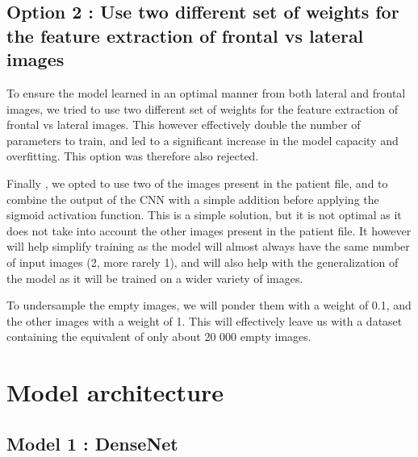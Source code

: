 \documentclass[11pt]{article}
\begin{document}
    \subsection{Option 2 : Use two different set of weights for the feature extraction of frontal vs lateral images}

        To ensure the model learned in an optimal manner from both lateral and frontal images, we tried to use two different set of weights for the feature extraction of frontal vs lateral images. This however
        effectively double the number of parameters to train, and led to a significant increase in the model capacity and overfitting. This option was therefore also rejected.

    Finally , we opted to use two of the images present in the patient file, and to combine the output of the CNN with a simple addition before applying the sigmoid activation function. This is a simple solution, but it is not optimal as it does not take into account the other images present in the patient file.
    It however will help simplify training as the model will almost always have the same number of input images (2, more rarely 1), and will also help with the generalization of the model as it will be trained on a wider variety of images.

    To undersample the empty images, we will ponder them with a weight of 0.1, and the other images with a weight of 1. This will effectively leave us with a dataset containing the equivalent of only about 20 000 empty images.





    \section{Model architecture}

    \subsection{Model 1 : DenseNet \cite{densenet}}
\end{document}
